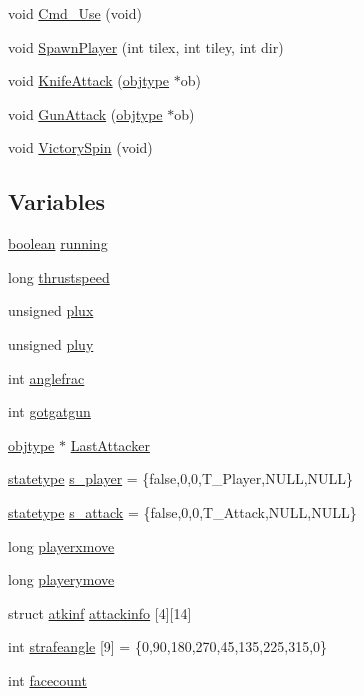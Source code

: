\begin{DoxyCompactItemize}
void \hyperlink{WL__AGENT_8C_aebccb5f10d715a9d66e9045fc2d372a0}{Cmd\_\-Use} (void)
\item 
void \hyperlink{WL__AGENT_8C_a4bc0a75c89b1b52cf115c63b5c07ff9c}{SpawnPlayer} (int tilex, int tiley, int dir)
\item 
void \hyperlink{WL__AGENT_8C_afd37f9f9ac8d36180f9348c67195a4db}{KnifeAttack} (\hyperlink{structobjstruct}{objtype} $\ast$ob)
\item 
void \hyperlink{WL__AGENT_8C_a1afb01b78673abfdfaddceee3a198eb5}{GunAttack} (\hyperlink{structobjstruct}{objtype} $\ast$ob)
\item 
void \hyperlink{WL__AGENT_8C_aac046185c3a93b503c24f82a7019e556}{VictorySpin} (void)
\end{DoxyCompactItemize}
\subsection*{Variables}
\begin{DoxyCompactItemize}
\item 
\hyperlink{ID__HEAD_8H_a7c6368b321bd9acd0149b030bb8275ed}{boolean} \hyperlink{WL__AGENT_8C_a2bb58b88ac256b165a95a806ae3b41e5}{running}
\item 
long \hyperlink{WL__AGENT_8C_ac9683e4ab6c67081743f542dc09a74c0}{thrustspeed}
\item 
unsigned \hyperlink{WL__AGENT_8C_a098f3c7a6e9b99f0d4d5fbb552b46754}{plux}
\item 
unsigned \hyperlink{WL__AGENT_8C_a2b130e086f58d4d881053d67b98c8251}{pluy}
\item 
int \hyperlink{WL__AGENT_8C_a1f69f7886d762367ccbc2596edaf00e9}{anglefrac}
\item 
int \hyperlink{WL__AGENT_8C_a4d977ede63beb6fb29e846e16204974b}{gotgatgun}
\item 
\hyperlink{structobjstruct}{objtype} $\ast$ \hyperlink{WL__AGENT_8C_aefadb4c91f358f1a8b80113dff2433f1}{LastAttacker}
\item 
\hyperlink{structstatestruct}{statetype} \hyperlink{WL__AGENT_8C_aef2c7d76826104ab1e029f84a95c41c7}{s\_\-player} = \{false,0,0,T\_\-Player,NULL,NULL\}
\item 
\hyperlink{structstatestruct}{statetype} \hyperlink{WL__AGENT_8C_a8cf5fca2f0794aeeca4ba0504e1230ef}{s\_\-attack} = \{false,0,0,T\_\-Attack,NULL,NULL\}
\item 
long \hyperlink{WL__AGENT_8C_a7f5cea5586913d773629c89545c77a07}{playerxmove}
\item 
long \hyperlink{WL__AGENT_8C_ab34d4aa1726c04e90dabd23eff2c324f}{playerymove}
\item 
struct \hyperlink{structatkinf}{atkinf} \hyperlink{WL__AGENT_8C_abc99d4ffe13803cdc38c290fb96a8b6f}{attackinfo} \mbox{[}4\mbox{]}\mbox{[}14\mbox{]}
\item 
int \hyperlink{WL__AGENT_8C_a57082f1acfc5cc0d2e86c88c1d22adff}{strafeangle} \mbox{[}9\mbox{]} = \{0,90,180,270,45,135,225,315,0\}
\item 
int \hyperlink{WL__AGENT_8C_aba3b8c5c49be6b7ece93f58d0283fdfe}{facecount}
\end{DoxyCompactItemize}


